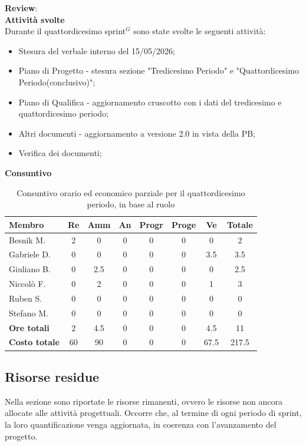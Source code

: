 \documentclass[a4paper,10pt]{article}
\begin{document}
\textbf{Review}: \\
\textbf{Attività svolte}\\
Durante il quattordicesimo sprint$^G$ sono state svolte le seguenti attività:
\begin{itemize}
  \item Stesura del verbale interno del 15/05/2026;
  \item Piano di Progetto - stesura sezione "Tredicesimo Periodo" e "Quattordicesimo Periodo(conclusivo)";
  \item Piano di Qualifica - aggiornamento cruscotto con i dati del tredicesimo e quattordicesimo periodo;
  \item Altri documenti - aggiornamento a versione 2.0 in vista della PB;
  \item Verifica dei documenti;
\end{itemize}
\textbf{Consuntivo}
\begin{table}[H]
  \centering
  \begin{tabular}{|l|c|c|c|c|c|c|c|}
    \hline
    \textbf{Membro} & \textbf{Re} & \textbf{Amm} & \textbf{An} & \textbf{Progr} & \textbf{Proge} & \textbf{Ve} & \textbf{Totale} \\
    \hline
    Besnik M.   & 2 & 0 & 0 & 0   & 0 & 0   & 2  \\
    Gabriele D. & 0 & 0 & 0 & 0   & 0 & 3.5   & 3.5  \\
    Giuliano B. & 0 & 2.5 & 0 & 0   & 0 & 0   & 2.5  \\
    Niccolò F.  & 0 & 2 & 0 & 0   & 0 & 1   & 3  \\
    Ruben S.    & 0 & 0 & 0 & 0   & 0 & 0   & 0 \\
    Stefano M.  & 0 & 0 & 0 & 0   & 0 & 0   & 0  \\
    \hline
    \textbf{Ore totali} & 2  & 4.5 & 0 & 0  & 0 & 4.5 & 11 \\
    \hline
    \textbf{Costo totale} & 60 & 90 & 0 & 0  & 0  & 67.5 & 217.5 \\
    \hline
  \end{tabular}
  \caption{Consuntivo orario ed economico parziale per il quattordicesimo periodo, in base al ruolo}
\end{table}

\subsection{Risorse residue}
Nella sezione sono riportate le risorse rimanenti, ovvero le risorse non ancora allocate alle attività progettuali. Occorre che, al termine di ogni periodo di sprint, la loro quantificazione venga aggiornata, in coerenza con l'avanzamento del progetto.
\end{document}
